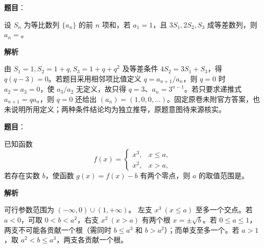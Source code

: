 \begin{answer}

\textbf{题目}：

设 \(S_n\) 为等比数列 \(\{a_n\}\) 的前 \(n\) 项和，若 \(a_1=1\)，且 \(3S_1,2S_2,S_3\) 成等差数列，则 \(a_n=\)\gkblank{}。

\textbf{解析}

由 \(S_1=1,S_2=1+q,S_3=1+q+q^2\) 及等差条件 \(4S_2=3S_1+S_3\)，得 \(q(q-3)=0\)。若题目采用相邻项比值定义 \(q=a_{n+1}/a_n\)，则 \(q=0\) 时 \(a_2=a_3=0\)，使 \(a_3/a_2\) 无定义，故只得 \(q=3\)、\(a_n=3^{n-1}\)。若只要求递推式 \(a_{n+1}=qa_n\)，则 \(q=0\) 还给出 \((a_n)=(1,0,0,\ldots)\)。固定原卷未附官方答案，也未说明所用定义；两种条件结论均为独立推导，原题意图待来源核实。


\end{answer}
\begin{answer}

\textbf{题目}：

已知函数
\nopagebreak[4]
\[
f(x)=\begin{cases}
x^3,&x\leqslant a,\\
x^2,&x>a,
\end{cases}
\]
若存在实数 \(b\)，使函数 \(g(x)=f(x)-b\) 有两个零点，则 \(a\) 的取值范围是\gkblank{}。

\textbf{解析}

可行参数范围为 \((-\infty,0)\cup(1,+\infty)\)。
左支 \(x^3\ (x\le a)\) 至多一个交点。若 \(a<0\)，可取 \(0<b<a^2\)，右支 \(x^2\ (x>a)\) 有两个根 \(x=\pm\sqrt b\)。若 \(0\le a\le1\)，两支不可能各贡献一个根（需同时 \(b\le a^3\) 和 \(b>a^2\)）；而单支至多一个。若 \(a>1\)，取 \(a^2<b\le a^3\)，两支各贡献一个根。


\end{answer}

